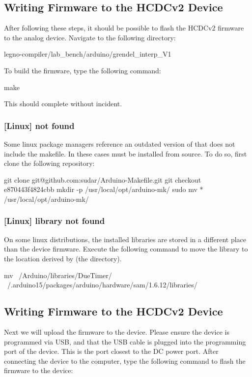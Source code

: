 \subsection{Writing Firmware to the HCDCv2 Device}
After following these steps, it should be possible to flash the HCDCv2
firmware to the analog device. Navigate to the following directory:

\begin{snippet}
  legno-compiler/lab_bench/arduino/grendel_interp_V1
\end{snippet}

To build the firmware, type the following command:
\begin{snippet}
  make
\end{snippet}

This should complete without incident. 


\subsubsection{[Linux]  not found}

Some linux package managers reference an outdated version of 
that does not include the  makefile. In these cases 
must be installed from source. To do so, first clone the following repository:

\begin{snippet}
git clone git@github.com:sudar/Arduino-Makefile.git
git checkout e870443f4824cbb
mkdir -p /usr/local/opt/arduino-mk/
sudo mv * /usr/local/opt/arduino-mk/
\end{snippet}

\subsubsection{[Linux]  library not found}

On some linux distributions, the installed libraries are stored in a different
place than the device firmware. Execute the following command to move the
 library to the location derived by  (the
 directory).

\begin{snippet}
  mv ~/Arduino/libraries/DueTimer/ ~/.arduino15/packages/arduino/hardware/sam/1.6.12/libraries/
\end{snippet}

\subsection{Writing Firmware to the HCDCv2 Device}
Next we will upload the firmware to the
device. Please ensure the device is programmed via USB,
and that the USB cable is plugged into the programming port of the device.
This is the port closest to the DC power port. After connecting the device to the computer, type the following command to flash the firmware to the device:

